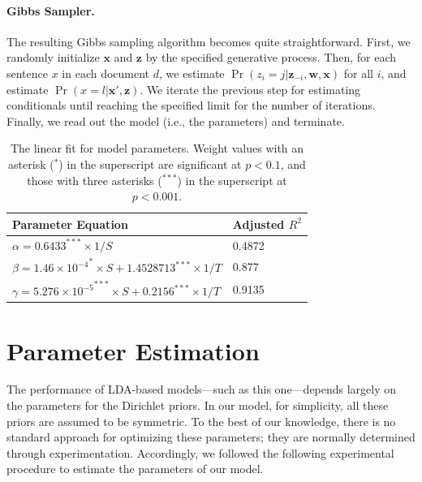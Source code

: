\paragraph{Gibbs Sampler.}  The resulting Gibbs sampling algorithm becomes
quite straightforward.  First, we randomly initialize $\mathbf{x}$ and
$\mathbf{z}$ by the specified generative process.  Then, for each sentence $x$
in each document $d$, we estimate $\Pr(z_i = j|\mathbf{z}_{-i}, \mathbf{w},
\mathbf{x})$ for all $i$, and estimate $\Pr(x = l|\mathbf{x}',\mathbf{z})$.  We
iterate the previous step for estimating conditionals until reaching the
specified limit for the number of iterations.  Finally, we read out the model
(i.e., the parameters) and terminate.

\begin{table}[!ht]
  \centering
  \begin{tabular}{ll}
    Parameter Equation &  Adjusted $R^2$ \\
    \hline
    $\alpha = 0.6433^{***} \times 1/S$ & 0.4872 \\
    $\beta = 1.46 \times {10^{-4}}^{*} \times S + 1.4528713^{***} \times 1/T$ & 0.877 \\
    $\gamma = 5.276 \times {10^{-5}}^{***} \times S + 0.2156^{***} \times 1/T $& 0.9135 
  \end{tabular}

  \caption{The linear fit for model parameters.  Weight values with
  an asterisk ($^*$) in the superscript are significant at $p < 0.1$, and those
  with three asterisks ($^{***}$) in the superscript at $p < 0.001$.} \label{t:model-parameters}
\end{table}

\section{Parameter Estimation} \label{s:parameter-estimation} The performance
of LDA-based models---such as this one---depends largely on the parameters for
the Dirichlet priors.  In our model, for simplicity, all these priors are
assumed to be symmetric.  To the best of our knowledge, there is no standard
approach for optimizing these parameters; they are normally determined through
experimentation.  Accordingly, we followed the following experimental procedure
to estimate the parameters of our model.

